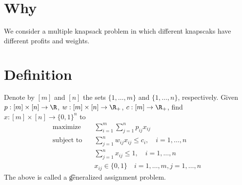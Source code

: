 
\section*{Why}

We consider a multiple knapsack problem in which different knapscaks have different profits and weights.

\section*{Definition}

Denote by $[m]$ and $[n]$ the sets $\{1, \dots , m\}$ and $\{1, \dots , n\}$, respectively.
Given $p: [m] \times  [n] \to \R $, $w: [m] \times  [n] \to \R _+$, $c: [m] \to \R _+$, find $x: [m] \times  [n] \to \{0,1\}^n$ to
\[
\begin{aligned}
\text{maximize} & \quad \textstyle \sum_{i = 1}^m \sum_{j = 1}^{n} p_{ij} x_{ij} \\
\text{subject to} & \quad \textstyle \sum_{j = 1}^n w_{ij}x_{ij} \leq c_i , \quad i = 1, \dots , n\\
& \quad \textstyle \sum_{j = 1}^{n} x_{ij} \leq 1, \quad i = 1, \dots , n \\
& \quad x_{ij} \in \{0,1\} \quad i = 1, \dots , m, j = 1, \dots , n
\end{aligned}
\]
The above is called a \t{generalized assignment problem}.

\blankpage